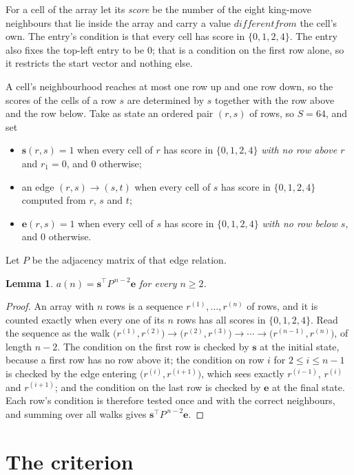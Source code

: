 \documentclass[11pt,a4paper]{article}
\theoremstyle{plain}
\newtheorem{lemma}[theorem]{Lemma}
\theoremstyle{definition}
\begin{document}
For a cell of the array let its \emph{score} be the number of the eight king-move neighbours that lie inside
the array and carry a value $different from$ the cell's own. The entry's condition is that every cell
has score in $\{0,1,2,4\}$. The entry also fixes the top-left entry to be $0$; that is a condition on the first row alone, so it restricts the start vector and nothing else.

A cell's neighbourhood reaches at most one row up and one row down, so the scores of the
cells of a row $s$ are determined by $s$ together with the row above and the row below.
Take as state an ordered pair $(r,s)$ of rows, so $S=64$, and set
\begin{itemize}
\item $\mathbf{s}(r,s)=1$ when every cell of $r$ has score in $\{0,1,2,4\}$ \emph{with no row
above $r$} and $r_1=0$, and $0$ otherwise;
\item an edge $(r,s)\to(s,t)$ when every cell of $s$ has score in $\{0,1,2,4\}$ computed from
$r$, $s$ and $t$;
\item $\mathbf{e}(r,s)=1$ when every cell of $s$ has score in $\{0,1,2,4\}$ \emph{with no row
below $s$}, and $0$ otherwise.
\end{itemize}
Let $P$ be the adjacency matrix of that edge relation.

\begin{lemma}\label{lem:walk}
$a(n)=\mathbf{s}^{\!\top}P^{\,n-2}\mathbf{e}$ for every $n\ge2$.
\end{lemma}

\begin{proof}
An array with $n$ rows is a sequence $r^{(1)},\dots,r^{(n)}$ of rows, and it is counted
exactly when every one of its $n$ rows has all scores in $\{0,1,2,4\}$. Read the sequence as the
walk $\bigl(r^{(1)},r^{(2)}\bigr)\to\bigl(r^{(2)},r^{(3)}\bigr)\to\cdots\to
\bigl(r^{(n-1)},r^{(n)}\bigr)$, of length $n-2$. The condition on the first row is
checked by $\mathbf{s}$ at the initial state, because a first row has no row above it; the
condition on row $i$ for $2\le i\le n-1$ is checked by the edge entering
$\bigl(r^{(i)},r^{(i+1)}\bigr)$, which sees exactly $r^{(i-1)}$, $r^{(i)}$ and
$r^{(i+1)}$; and the condition on the last row is checked by $\mathbf{e}$ at the final
state. Each row's condition is therefore tested once and with the correct neighbours, and
summing over all walks gives $\mathbf{s}^{\!\top}P^{\,n-2}\mathbf{e}$.
\end{proof}

\section{The criterion}
\end{document}
